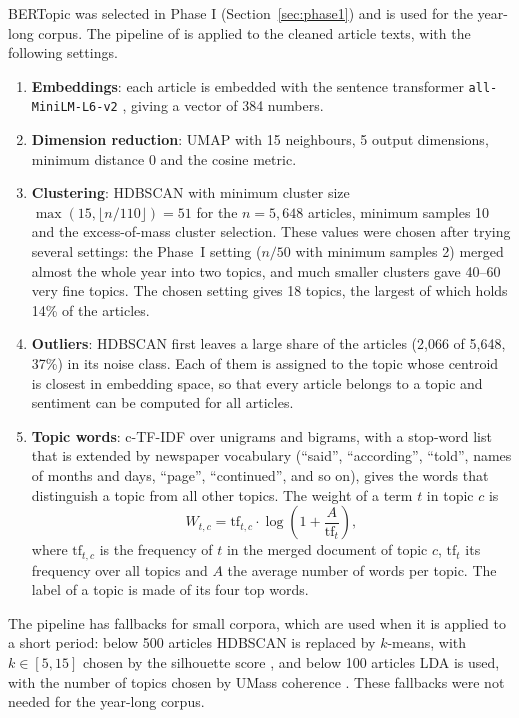 BERTopic was selected in Phase I (Section~\ref{sec:phase1}) and is used for the year-long corpus. The pipeline of \cite{grootendorst2022} is applied to the cleaned article texts, with the following settings.
\begin{enumerate}
\item \textbf{Embeddings}: each article is embedded with the sentence transformer \texttt{all-MiniLM-L6-v2} \cite{wang2020,reimers2019}, giving a vector of 384 numbers.
\item \textbf{Dimension reduction}: UMAP \cite{mcinnes2018} with 15 neighbours, 5 output dimensions, minimum distance 0 and the cosine metric.
\item \textbf{Clustering}: HDBSCAN \cite{campello2013} with minimum cluster size $\max(15, \lfloor n/110\rfloor) = 51$ for the $n = 5{,}648$ articles, minimum samples 10 and the excess-of-mass cluster selection. These values were chosen after trying several settings: the Phase~I setting ($n/50$ with minimum samples 2) merged almost the whole year into two topics, and much smaller clusters gave 40--60 very fine topics. The chosen setting gives 18 topics, the largest of which holds 14\% of the articles.
\item \textbf{Outliers}: HDBSCAN first leaves a large share of the articles (2,066 of 5,648, 37\%) in its noise class. Each of them is assigned to the topic whose centroid is closest in embedding space, so that every article belongs to a topic and sentiment can be computed for all articles.
\item \textbf{Topic words}: c-TF-IDF over unigrams and bigrams, with a stop-word list that is extended by newspaper vocabulary (``said'', ``according'', ``told'', names of months and days, ``page'', ``continued'', and so on), gives the words that distinguish a topic from all other topics. The weight of a term $t$ in topic $c$ is
\begin{equation}
W_{t,c} = \mathrm{tf}_{t,c}\cdot \log\left(1 + \frac{A}{\mathrm{tf}_t}\right),
\end{equation}
where $\mathrm{tf}_{t,c}$ is the frequency of $t$ in the merged document of topic $c$, $\mathrm{tf}_t$ its frequency over all topics and $A$ the average number of words per topic. The label of a topic is made of its four top words.
\end{enumerate}
The pipeline has fallbacks for small corpora, which are used when it is applied to a short period: below 500 articles HDBSCAN is replaced by $k$-means, with $k \in [5,15]$ chosen by the silhouette score \cite{rousseeuw1987}, and below 100 articles LDA is used, with the number of topics chosen by UMass coherence \cite{mimno2011}. These fallbacks were not needed for the year-long corpus.

